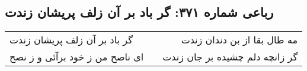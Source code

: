 \begin{center}
\section*{رباعی شماره ۳۷۱: گر باد بر آن زلف پریشان زندت}
\label{sec:0371}
\begin{longtable}{l p{0.5cm} r}
گر باد بر آن زلف پریشان زندت
&&
مه طال بقا از بن دندان زندت
\\
ای ناصح من ز خود برآئی و ز نصح
&&
گر زانچه دلم چشیده بر جان زندت
\\
\end{longtable}
\end{center}
